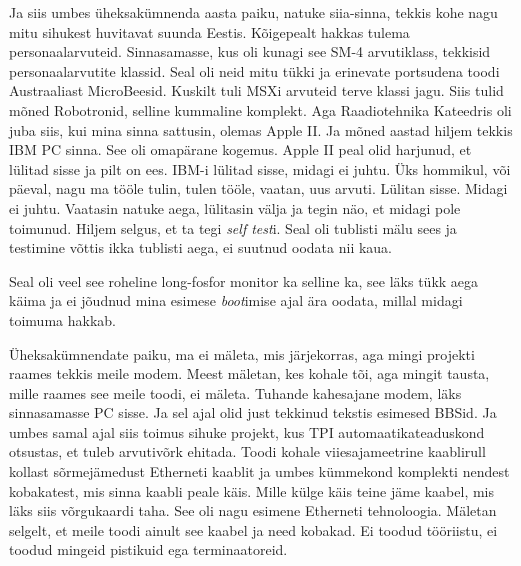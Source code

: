 Ja siis umbes üheksakümnenda aasta paiku, natuke siia-sinna, tekkis kohe nagu mitu sihukest huvitavat suunda Eestis. Kõigepealt hakkas tulema personaalarvuteid. Sinnasamasse, kus oli kunagi see SM-4 arvutiklass, tekkisid personaalarvutite klassid. Seal oli  neid mitu tükki ja erinevate portsudena toodi Austraaliast MicroBeesid. Kuskilt tuli MSXi arvuteid terve klassi jagu. Siis tulid mõned Robotronid, selline kummaline komplekt. Aga Raadiotehnika Kateedris oli juba siis, kui mina sinna sattusin, olemas Apple II. Ja mõned aastad hiljem tekkis IBM PC sinna. See oli omapärane kogemus. Apple II peal olid harjunud, et lülitad sisse ja pilt on ees. IBM-i lülitad sisse, midagi ei juhtu. Üks hommikul, või päeval, nagu ma tööle tulin, tulen tööle, vaatan, uus arvuti. Lülitan sisse. Midagi ei juhtu. Vaatasin natuke aega, lülitasin välja ja tegin näo, et midagi pole toimunud. Hiljem selgus, et ta tegi \emph{self test}i. Seal oli tublisti mälu sees ja testimine võttis ikka tublisti aega, ei suutnud oodata nii kaua. 


Seal oli veel see roheline long-fosfor monitor ka selline ka, see läks tükk aega käima ja ei jõudnud mina esimese \emph{boot}imise ajal ära oodata, millal midagi toimuma hakkab.

Üheksakümnendate paiku, ma ei mäleta, mis järjekorras, aga mingi projekti raames tekkis meile modem. Meest mäletan, kes kohale tõi, aga mingit tausta, mille raames see meile toodi, ei mäleta. Tuhande kahesajane modem, läks sinnasamasse PC sisse. Ja sel ajal olid just tekkinud tekstis esimesed BBSid. Ja umbes samal ajal siis toimus sihuke projekt, kus TPI automaatikateaduskond otsustas, et tuleb arvutivõrk ehitada. Toodi kohale viiesajameetrine kaablirull kollast sõrmejämedust Etherneti kaablit ja umbes kümmekond komplekti nendest kobakatest, mis sinna kaabli peale käis. Mille külge käis teine jäme kaabel, mis läks siis võrgukaardi taha. See oli nagu esimene Etherneti tehnoloogia. Mäletan selgelt, et meile toodi ainult see kaabel ja need kobakad. Ei toodud tööriistu, ei toodud mingeid pistikuid ega terminaatoreid.

